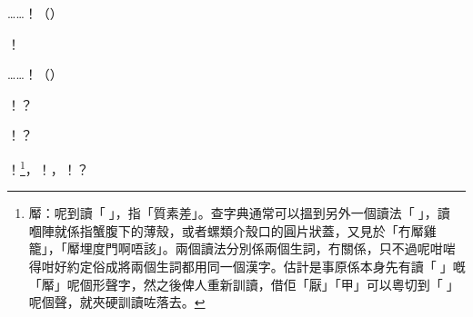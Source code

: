 \begin{dialogue}
……！（）
\end{dialogue}
\begin{dialogue}
！
\end{dialogue}
\begin{dialogue}
……！（）
\end{dialogue}
\begin{dialogue}
！？
\end{dialogue}
\begin{dialogue}
！？
\end{dialogue}
\begin{dialogue}
！\footnote{厴：呢到讀「󱕆」，指「質素差」。查字典通常可以搵到另外一個讀法「󱗱」，讀󱗱嗰陣就係指蟹腹下的薄殼，或者螺類介殼口的圓片狀蓋，又見於「冇厴雞籠」，「厴埋度門啊唔該」。兩個讀法分別係兩個生詞，冇關係，只不過呢咁啱得咁好約定俗成將兩個生詞都用同一個漢字。估計是事原係本身先有讀「󱗱」嘅「厴」呢個形聲字，然之後俾人重新訓讀，借佢「厭」「甲」可以粵切到「󱕆」呢個聲，就夾硬訓讀咗落去。}，！，！？
\end{dialogue}



